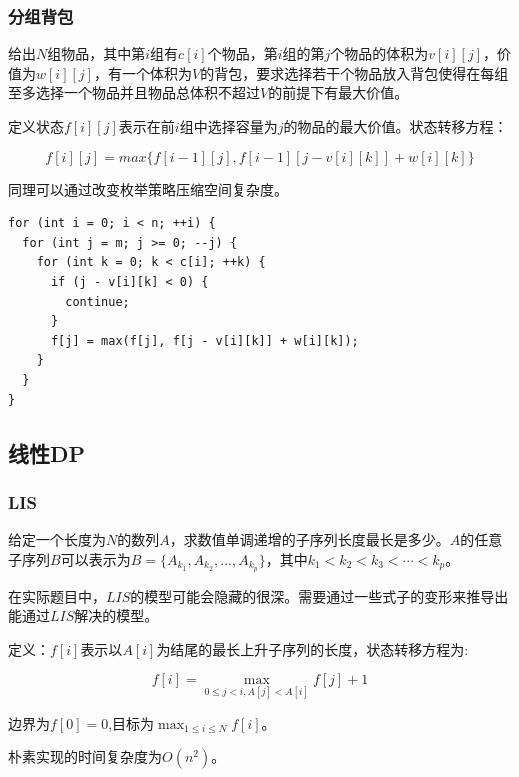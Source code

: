 \documentclass[11pt]{article}
\begin{document}
\subsubsection{分组背包}
\label{sec-5-2-4}

给出\(N\)组物品，其中第\(i\)组有\(c[i]\)个物品，第\(i\)组的第\(j\)个物品的体积为\(v[i][j]\)，价值为\(w[i][j]\)，有一个体积为\(V\)的背包，要求选择若干个物品放入背包使得在每组至多选择一个物品并且物品总体积不超过\(V\)的前提下有最大价值。

定义状态\(f[i][j]\)表示在前\(i\)组中选择容量为\(j\)的物品的最大价值。状态转移方程：

$$
f[i][j]=max\{f[i-1][j],f[i-1][j-v[i][k]]+w[i][k]\}
$$

同理可以通过改变枚举策略压缩空间复杂度。

\begin{verbatim}
for (int i = 0; i < n; ++i) {
  for (int j = m; j >= 0; --j) {
    for (int k = 0; k < c[i]; ++k) {
      if (j - v[i][k] < 0) {
        continue;
      }
      f[j] = max(f[j], f[j - v[i][k]] + w[i][k]);
    }
  }
}
\end{verbatim}

\subsection{线性DP}
\label{sec-5-3}
\subsubsection{LIS}
\label{sec-5-3-1}

给定一个长度为\(N\)的数列\(A\)，求数值单调递增的子序列长度最长是多少。\(A\)的任意子序列\(B\)可以表示为\(B=\{A_{k_1},A_{k_2},...,A_{k_p}\}\)，其中\(k_1 < k_2 < k_3 < \cdots < k_p\)。

在实际题目中，\(LIS\)的模型可能会隐藏的很深。需要通过一些式子的变形来推导出能通过\(LIS\)解决的模型。

定义：\(f[i]\)表示以\(A[i]\)为结尾的最长上升子序列的长度，状态转移方程为:

$$
f[i]= \max_{0 \leq j < i,A[j] < A[i]} {f[j]+1}
$$

边界为\(f[0]=0\),目标为\(\max_{1 \leq i \leq N} {f[i]}\)。

朴素实现的时间复杂度为\(O(n^2)\)。
\end{document}
